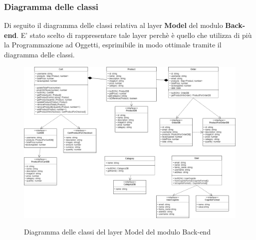\subsubsection{Diagramma delle classi}
Di seguito il diagramma delle classi relativa al layer \textbf{Model} del modulo \textbf{Back-end}. E' stato scelto di rappresentare tale layer perchè è quello che utilizza di più la Programmazione ad Oggetti, esprimibile in modo ottimale tramite il diagramma delle classi.

\vspace{1cm}

\begin{figure}[H]
\centering
\includegraphics[scale=0.35]{res/Architettura/Backend/img/diagrammaClassiBack-end.png}\\
\caption{Diagramma delle classi del layer Model del modulo Back-end}
\end{figure}